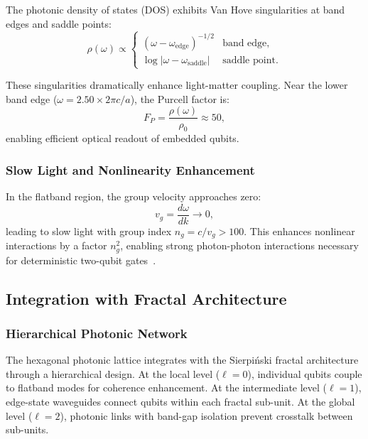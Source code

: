 The photonic density of states (DOS) exhibits Van Hove singularities at band edges and saddle points:
\begin{equation}
\rho(\omega) \propto \begin{cases}
(\omega - \omega_{\mathrm{edge}})^{-1/2} & \text{band edge}, \\
\log|\omega - \omega_{\mathrm{saddle}}| & \text{saddle point}.
\end{cases}
\end{equation}

These singularities dramatically enhance light-matter coupling. Near the lower band edge ($\omega = 2.50 \times 2\pi c/a$), the Purcell factor is:
\begin{equation}
F_P = \frac{\rho(\omega)}{\rho_0} \approx 50,
\end{equation}
enabling efficient optical readout of embedded qubits.

\subsubsection{Slow Light and Nonlinearity Enhancement}

In the flatband region, the group velocity approaches zero:
\begin{equation}
v_g = \frac{d\omega}{dk} \to 0,
\end{equation}
leading to slow light with group index $n_g = c/v_g > 100$. This enhances nonlinear interactions by a factor $n_g^2$, enabling strong photon-photon interactions necessary for deterministic two-qubit gates~\cite{Chang2014}.

\subsection{Integration with Fractal Architecture}

\subsubsection{Hierarchical Photonic Network}

The hexagonal photonic lattice integrates with the Sierpi\'{n}ski fractal architecture through a hierarchical design. At the local level ($\ell = 0$), individual qubits couple to flatband modes for coherence enhancement. At the intermediate level ($\ell = 1$), edge-state waveguides connect qubits within each fractal sub-unit. At the global level ($\ell = 2$), photonic links with band-gap isolation prevent crosstalk between sub-units.


